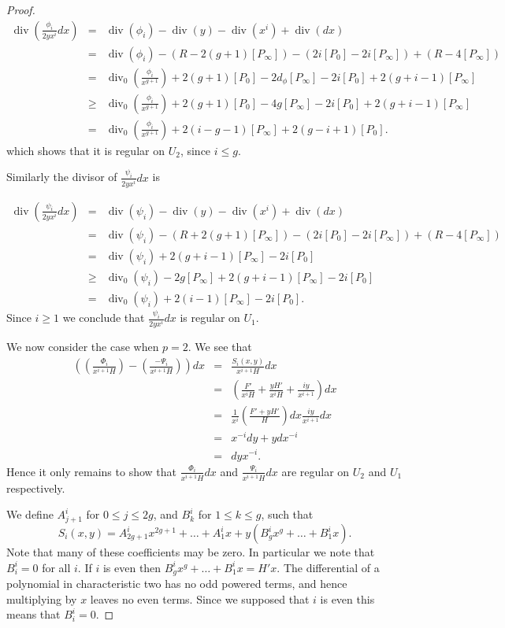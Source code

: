 \documentclass[draft, 11pt]{article} %
\theoremstyle{plain}
\theoremstyle{remark}
\DeclareMathOperator{\di}{div}
\begin{document}
\begin{proof}
\begin{eqnarray*}
\di\left( \frac{\phi_i}{2yx^i}dx \right) & = & \di(\phi_i) -\di(y) - \di(x^i) + \di (dx) \\
& = & \di(\phi_i) - ( R - 2(g+1)[P_\infty]) - (2i[P_0] - 2i[P_\infty]) + (R - 4[P_\infty]) \\
& = & \di_0\left( \frac{\phi_i}{x^{g+1}}\right) + 2(g+1)[P_0] - 2d_\phi[P_\infty] - 2i[P_0] + 2(g+i-1)[P_\infty] \\
& \geq & \di_0\left( \frac{\phi_i}{x^{g+1}}\right) + 2(g+1)[P_0] - 4g[P_\infty] - 2i[P_0] + 2(g+i-1)[P_\infty] \\
& = & \di_0\left( \frac{\phi_i}{x^{g+1}} \right) + 2(i-g-1)[P_\infty] + 2(g-i+1)[P_0].
\end{eqnarray*}
which shows that it is regular on $U_2$, since $i \leq g$.

Similarly the divisor of $\frac{\psi_i}{2yx^i}dx$ is

\begin{eqnarray*}
\di \left( \frac{\psi_i}{2yx^i}dx\right) & = & \di(\psi_i) - \di(y) - \di(x^i) + \di (dx) \\
& = & \di (\psi_i ) -(R + 2(g+1)[P_\infty]) - (2i[P_0] - 2i[P_\infty]) + (R -4[P_\infty]) \\
& = & \di(\psi_i) + 2(g+i-1)[P_\infty] -2i[P_0] \\
& \geq & \di_0(\psi_i) - 2g[P_\infty] + 2(g+i-1)[P_\infty] -2i[P_0] \\
& = & \di_0(\psi_i) + 2(i-1)[P_\infty] - 2i[P_0].
\end{eqnarray*}
Since $i\geq 1$ we conclude that $\frac{\psi_i}{2yx^i}dx$ is regular on $U_1$.


We now consider the case when $p=2$.
We see that
\begin{eqnarray*}
\left( \left( \frac{\Phi_i}{x^{i+1}H} \right) - \left( \frac{- \Psi_i}{x^{i+1}H} \right) \right) dx & = & \frac{S_i(x,y)}{x^{i+1}H}dx \\
& = & \left( \frac{F'}{x^iH} + \frac{yH'}{x^iH} + \frac{iy}{x^{i+1}} \right) dx \\
& = & \frac{1}{x^i}\left( \frac{F' + yH'}{H} \right) dx \frac{iy}{x^{i+1}}dx \\
& = & x^{-i}dy + ydx^{-i} \\
& = & dyx^{-i}.
\end{eqnarray*}
Hence it only remains to show that $\frac{\Phi_i}{x^{i+1}H}dx$ and $\frac{\Psi_i}{x^{i+1}H}dx$ are regular on $U_2$ and $U_1$ respectively.


We define $A^i_{j+1}$ for $0 \leq j \leq 2g$, and $B_k^i$ for $1\leq k \leq g$, such that
\[
S_i(x,y) = A_{2g+1}^ix^{2g+1} + \ldots + A^i_1 x + y(B_g^i x^g + \ldots + B_1^i x).
\]
Note that many of these coefficients may be zero.
In particular we note that $B_i^i = 0$ for all $i$.
If $i$ is even then $B_g^ix^g + \ldots + B_1^ix = H'x$.
The differential of a polynomial in characteristic two has no odd powered terms, and hence multiplying by $x$ leaves no even terms.
Since we supposed that $i$ is even this means that $B_i^i = 0$.


\end{proof}
\end{document}
